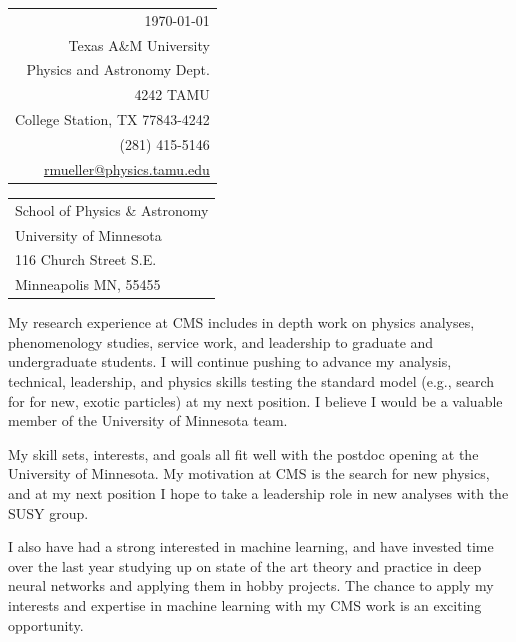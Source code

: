 \documentclass[11pt]{article}
\begin{document}
\hfill%
\begin{tabular}{@{}r@{}}
  \today \\
  [.5em]
Texas A\&M University \\
Physics and Astronomy Dept. \\
4242 TAMU \\
College Station, TX 77843-4242 \\
[.5em]
(281) 415-5146 \\
\href{mailto:rmueller@physics.tamu.edu}{rmueller@physics.tamu.edu}\\
\end{tabular}



\bigskip


\begin{tabular}{@{}l@{}}
School of Physics \& Astronomy \\
 University of Minnesota \\
116 Church Street S.E. \\
Minneapolis MN, 55455
\end{tabular}



\bigskip

My research experience at CMS includes in depth work on physics analyses, phenomenology studies, service work, and leadership to graduate and undergraduate students. I will continue pushing to advance my analysis, technical, leadership, and physics skills testing the standard model (e.g., search for for new, exotic particles) at my next position. I believe I would be a valuable member of the University of Minnesota team. 

My skill sets, interests, and goals all fit well with the postdoc opening at the University of Minnesota. My motivation at CMS is the search for new physics, and at my next position I hope to take a leadership role in new analyses with the SUSY group. 

I also have had a strong interested in machine learning, and have invested time over the last year studying up on state of the art theory and practice in deep neural networks and applying them in hobby projects. The chance to apply my interests and expertise in machine learning with my CMS work is an exciting opportunity. 
\end{document}
